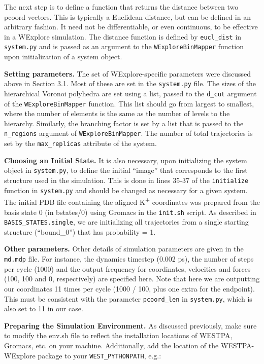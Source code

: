 \documentclass[9pt,tutorial,pubversion]{livecoms}
\begin{document}
The next step is to define a function that returns the distance between two pcoord vectors. 
This is typically a Euclidean distance, but can be defined in an arbitrary fashion. 
It need not be differentiable, or even continuous, to be effective in a WExplore simulation. 
The distance function is defined by \verb|eucl_dist| in \verb|system.py| and is passed as an argument to the \verb|WExploreBinMapper| function upon initialization of a system object.

\textbf{Setting parameters.} The set of WExplore-specific parameters were discussed above in Section 3.1. 
Most of these are set in the \verb|system.py| file. The sizes of the hierarchical Voronoi polyhedra are set using a list, passed to the \verb|d_cut| argument of the \verb|WExploreBinMapper| function. 
This list should go from largest to smallest, where the number of elements is the same as the number of levels to the hierarchy. 
Similarly, the branching factor is set by a list that is passed to the \verb|n_regions| argument of \verb|WExploreBinMapper|. 
The number of total trajectories is set by the \verb|max_replicas| attribute of the system.

\textbf{Choosing an Initial State.} It is also necessary, upon initializing the system object in \verb|system.py|, to define the initial “image” that corresponds to the first structure used in the simulation. 
This is done in lines 35-37 of the \verb|initialize| function in \verb|system.py| and should be changed as necessary for a given system. 
The initial PDB file containing the aligned K\textsuperscript{+} coordinates was prepared from the basis state 0 (in bstates/0) using Gromacs in the \verb|init.sh| script. 
As described in \verb|BASIS_STATES.single|, we are initializing all trajectories from a single starting structure (“bound\_0”) that has probability = 1.

\textbf{Other parameters.} Other details of simulation parameters are given in the \verb|md.mdp| file. 
For instance, the dynamics timestep (0.002 ps), the number of steps per cycle (1000) and the output frequency for coordinates, velocities and forces (100, 100 and 0, respectively) are specified here. 
Note that here we are outputting our coordinates 11 times per cycle (1000 / 100, plus one extra for the endpoint). 
This must be consistent with the parameter \verb|pcoord_len| in \verb|system.py|, which is also set to 11 in our case.

\textbf{Preparing the Simulation Environment.} As discussed previously, make sure to modify the env.sh file to reflect the installation locations of WESTPA, Gromacs, etc. on your machine. 
Additionally, add the location of the WESTPA-WExplore package to your \verb|WEST_PYTHONPATH|, e.g.:
\end{document}
